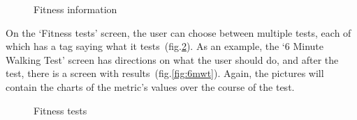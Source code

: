 \begin{figure}[h!]
    \centering
    \hfill
    \caption{Fitness information}
    \label{fig:fitnessInfo}
\end{figure}

On the `Fitness tests' screen, the user can choose between multiple tests, each of which has a tag saying what it tests~(fig.\ref{fig:fitnessTests}).
As an example, the `6 Minute Walking Test' screen has directions on what the user should do, and after the test, there is a screen with results~(fig.\ref{fig:6mwt}).
Again, the pictures will contain the charts of the metric's values over the course of the test.

\begin{figure}[h!]
    \centering
    \hfill
    \caption{Fitness tests}
    \label{fig:fitnessTests}
\end{figure}

